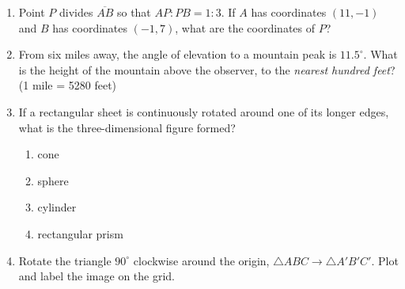 \documentclass[12pt, oneside]{article}
\begin{document}
\begin{enumerate}[itemsep=1.2cm]
\item Point $P$ divides $\overline{AB}$ so that $AP:PB = 1:3$. If $A$ has coordinates $(11,-1)$ and $B$ has coordinates $(-1,7)$, what are the coordinates of $P$?
\vspace{1cm}

\item From six miles away, the angle of elevation to a mountain peak is $11.5^\circ$. What is the height of the mountain above the observer, to the \emph{nearest hundred feet}? (1 mile = 5280 feet)
  \begin{center}
  \end{center} \vspace{1cm}

\item If a rectangular sheet is continuously rotated around one of its longer edges, what is the three-dimensional figure formed?
  \begin{multicols}{2}
  \begin{enumerate}
    \item cone
    \item sphere
    \item cylinder
    \item rectangular prism
  \end{enumerate}
\end{multicols}

\newpage
\item Rotate the triangle $90^\circ$ clockwise around the origin, $\triangle ABC \rightarrow \triangle A'B'C'$. Plot and label the image on the grid.
  \begin{center}
    \end{center}
    

\end{enumerate}
\end{document}
